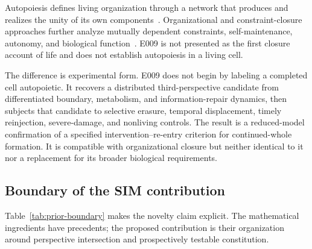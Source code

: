 \documentclass[11pt,a4paper]{article}
\begin{document}
Autopoiesis defines living organization through a network that produces and realizes the unity of its own components~\cite{varela1974,maturana1980}. Organizational and constraint-closure approaches further analyze mutually dependent constraints, self-maintenance, autonomy, and biological function~\cite{mossio2009,mossio2010,montevil2015,moreno2015}. E009 is not presented as the first closure account of life and does not establish autopoiesis in a living cell.

The difference is experimental form. E009 does not begin by labeling a completed cell autopoietic. It recovers a distributed third-perspective candidate from differentiated boundary, metabolism, and information-repair dynamics, then subjects that candidate to selective erasure, temporal displacement, timely reinjection, severe-damage, and nonliving controls. The result is a reduced-model confirmation of a specified intervention--re-entry criterion for continued-whole formation. It is compatible with organizational closure but neither identical to it nor a replacement for its broader biological requirements.

\subsection{Boundary of the SIM contribution}

Table~\ref{tab:prior-boundary} makes the novelty claim explicit. The mathematical ingredients have precedents; the proposed contribution is their organization around perspective intersection and prospectively testable constitution.
\end{document}
